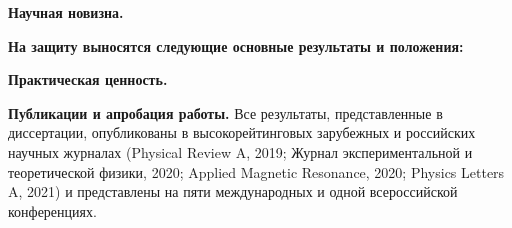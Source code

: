 


\textbf{Научная новизна.}


\textbf{На защиту выносятся следующие основные результаты и положения:}


\textbf{Практическая ценность.}


\textbf{Публикации и апробация работы.}
Все результаты, представленные в диссертации,
опубликованы в высокорейтинговых зарубежных и российских научных журналах (Physical Review A, 2019;  Журнал экспериментальной и теоретической физики, 2020; Applied Magnetic Resonance, 2020; Physics Letters A, 2021) и представлены на пяти международных и одной всероссийской конференциях.



